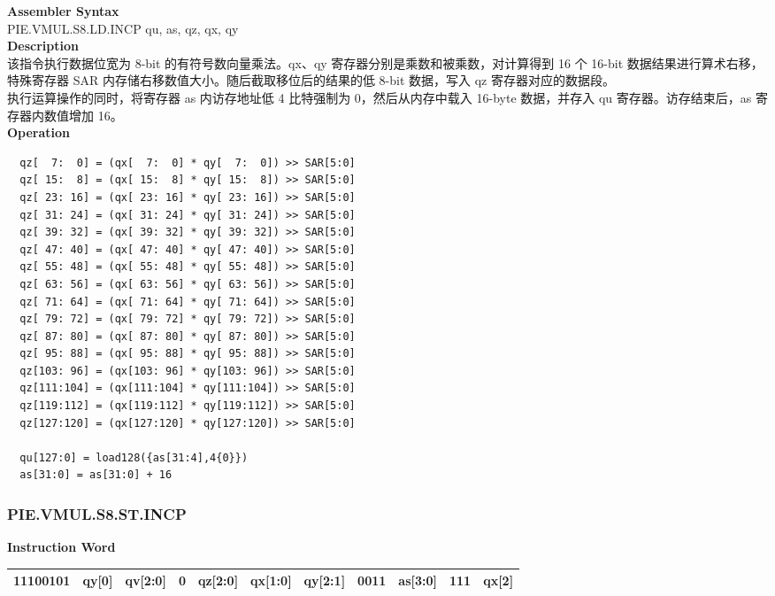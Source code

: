 \textbf{Assembler Syntax} \\
PIE.VMUL.S8.LD.INCP qu, as, qz, qx, qy \\
\textbf{Description} \\
该指令执行数据位宽为 8-bit 的有符号数向量乘法。qx、qy 寄存器分别是乘数和被乘数，对计算得到 16 个 16-bit 数据结果进行算术右移，特殊寄存器 SAR 内存储右移数值大小。随后截取移位后的结果的低 8-bit 数据，写入 qz 寄存器对应的数据段。\\ 执行运算操作的同时，将寄存器 as 内访存地址低 4 比特强制为 0，然后从内存中载入 16-byte 数据，并存入 qu 寄存器。访存结束后，as 寄存器内数值增加 16。\\
\textbf{Operation}
\begin{lstlisting}
  qz[  7:  0] = (qx[  7:  0] * qy[  7:  0]) >> SAR[5:0]
  qz[ 15:  8] = (qx[ 15:  8] * qy[ 15:  8]) >> SAR[5:0]
  qz[ 23: 16] = (qx[ 23: 16] * qy[ 23: 16]) >> SAR[5:0]
  qz[ 31: 24] = (qx[ 31: 24] * qy[ 31: 24]) >> SAR[5:0]
  qz[ 39: 32] = (qx[ 39: 32] * qy[ 39: 32]) >> SAR[5:0]
  qz[ 47: 40] = (qx[ 47: 40] * qy[ 47: 40]) >> SAR[5:0]
  qz[ 55: 48] = (qx[ 55: 48] * qy[ 55: 48]) >> SAR[5:0]
  qz[ 63: 56] = (qx[ 63: 56] * qy[ 63: 56]) >> SAR[5:0]
  qz[ 71: 64] = (qx[ 71: 64] * qy[ 71: 64]) >> SAR[5:0]
  qz[ 79: 72] = (qx[ 79: 72] * qy[ 79: 72]) >> SAR[5:0]
  qz[ 87: 80] = (qx[ 87: 80] * qy[ 87: 80]) >> SAR[5:0]
  qz[ 95: 88] = (qx[ 95: 88] * qy[ 95: 88]) >> SAR[5:0]
  qz[103: 96] = (qx[103: 96] * qy[103: 96]) >> SAR[5:0]
  qz[111:104] = (qx[111:104] * qy[111:104]) >> SAR[5:0]
  qz[119:112] = (qx[119:112] * qy[119:112]) >> SAR[5:0]
  qz[127:120] = (qx[127:120] * qy[127:120]) >> SAR[5:0]

  qu[127:0] = load128({as[31:4],4{0}})
  as[31:0] = as[31:0] + 16
\end{lstlisting}

\newpage
\subsubsection{PIE.VMUL.S8.ST.INCP}\label{instruction:PIEVMULS8STINCP}
\setlength\tabcolsep{6pt}
\textbf{Instruction Word} \\
\begin{tabular}{|c|c|c|c|c|c|c|c|c|c|c|}
	\hline
	11100101 & qy[0] & qv[2:0] & 0 & qz[2:0] & qx[1:0] & qy[2:1] & 0011 & as[3:0] & 111 & qx[2] \\
	\hline
\end{tabular}

